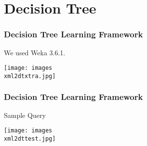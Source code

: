 \section{Decision Tree}
\begin{frame}
\frametitle{Decision Tree Learning Framework}

We used Weka 3.6.1\citep*{weka}.

\texttt{[image: images\\xml2dtxtra.jpg]}

\end{frame}

\begin{frame}
\frametitle{Decision Tree Learning Framework}

Sample Query

\texttt{[image: images\\xml2dttest.jpg]}
\end{frame}